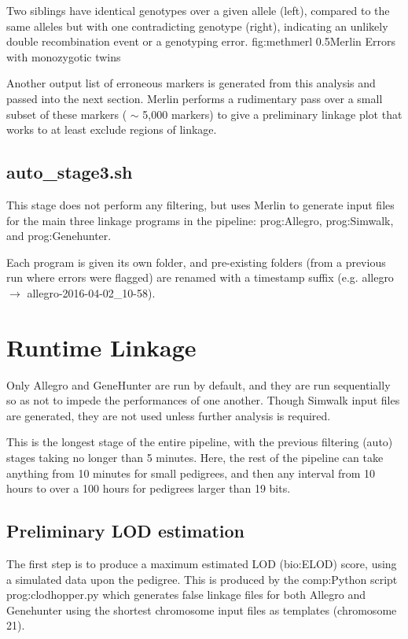 	{Two siblings have identical genotypes over a given allele (left), compared to the same alleles but with one contradicting genotype (right), indicating an unlikely double recombination event or a genotyping error.}
	{fig:methmerl}
	{0.5}{Merlin Errors with monozygotic twins}

Another output list of erroneous markers is generated from this analysis and passed into the next section. Merlin performs a rudimentary pass over a small subset of these markers ( $\sim$ 5,000 markers) to give a preliminary linkage plot that works to at least exclude regions of linkage.

\subsection{auto\_stage3.sh}

This stage does not perform any filtering, but uses Merlin to generate input files for the main three linkage programs in the pipeline: \gls{prog:Allegro}, \gls{prog:Simwalk}, and \gls{prog:Genehunter}.

Each program is given its own folder, and pre-existing folders (from a previous run where errors were flagged) are renamed with a timestamp suffix (e.g. allegro \(\rightarrow\) allegro-2016-04-02\_10-58).


\section{Runtime Linkage}

Only Allegro and GeneHunter are run by default, and they are run sequentially so as not to impede the performances of one another. Though Simwalk input files are generated, they are not used unless further analysis is required.

This is the longest stage of the entire pipeline, with the previous filtering (auto) stages taking no longer than 5 minutes. Here, the rest of the pipeline can take anything from 10 minutes for small pedigrees, and then any interval from 10 hours to over a 100 hours for pedigrees larger than 19 bits.

\subsection{Preliminary LOD estimation}

The first step is to produce a maximum estimated LOD (\gls{bio:ELOD}) score, using a simulated data upon the pedigree.  This is produced by the \gls{comp:Python} script \gls{prog:clodhopper.py} which generates false linkage files for both Allegro and Genehunter using the shortest chromosome input files as templates (chromosome 21).

